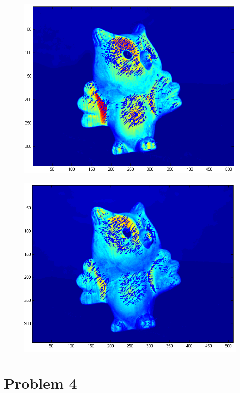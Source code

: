 \documentclass[11pt,psfig]{article}
\begin{document}
\begin{figure}[H]
\centering
\includegraphics[height=3.5in]{prob3figure4.png}
\end{figure}
\begin{figure}[H]
\centering
\includegraphics[height=3.5in]{prob3figure5.png}
\end{figure}

\newpage

\section*{Problem 4}
\end{document}
